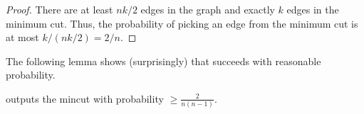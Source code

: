 \begin{proof}
    There are at least $n k/2$ edges in the graph and exactly $k$
    edges in the minimum cut. Thus, the probability of picking an edge
    from the minimum cut is at most $k/(n k/2)=2/n$.
\end{proof}



\providecommand\Ccancel[2][black]{%
   \renewcommand\CancelColor{\color{#1}}\cancel{#2}}

The following lemma shows (surprisingly) that \MinCut{} succeeds with
reasonable probability.


\begin{lemma}
    \MinCut{} outputs the mincut with probability $\displaystyle \geq
    \frac{2}{n ( n-1 ) }$.    
\end{lemma}
